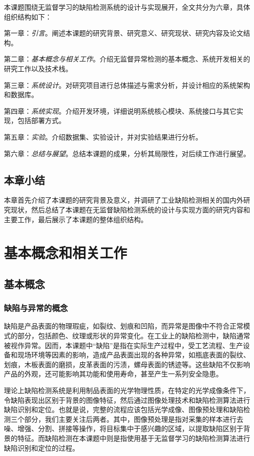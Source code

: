 \documentclass[
  ]{njuthesis}
\begin{document}
本课题围绕无监督学习的缺陷检测系统的设计与实现展开，全文共分为六章，具体组织结构如下：  

第一章：\textit{引言}。阐述本课题的研究背景、研究意义、研究现状、研究内容及论文结构。

第二章：\textit{基本概念与相关工作}。介绍无监督异常检测的基本概念、系统开发相关的研究工作以及技术栈。

第三章：\textit{系统设计}。对研究项目进行总体描述与需求分析，并设计相应的系统架构和数据库。

第四章：\textit{系统实现}。介绍开发环境，详细说明系统核心模块、系统接口与其它实现，包括部署方式。

第五章：\textit{实验}。介绍数据集、实验设计，并对实验结果进行分析。

第六章：\textit{总结与展望}。总结本课题的成果，分析其局限性，对后续工作进行展望。 

\section{本章小结}

本章首先介绍了本课题的研究背景及意义，并调研了工业缺陷检测相关的国内外研究现状，然后总结了本课题在无监督缺陷检测系统的设计与实现方面的研究内容和主要工作，最后展示了本课题的整体组织结构。

\chapter{基本概念和相关工作}

\section{基本概念}

\subsection{缺陷与异常的概念}

缺陷是产品表面的物理瑕疵，如裂纹、划痕和凹陷，而异常是图像中不符合正常模式的部分，包括颜色、纹理或形状的异常变化\cite{[6]}。在工业上的缺陷检测中，缺陷通常被视作异常。因而，本课题中“缺陷”是指在实际生产过程中，受工艺流程、生产设备和现场环境等因素的影响，造成产品表面出现的各种异常\cite{[4]}，如瓶底表面的裂纹、划痕，木板表面的磨损，皮革表面的污渍，螺母表面的锈迹等。这些缺陷不仅影响产品的外观，还可能影响其功能和使用寿命，甚至产生一系列安全隐患。

理论上缺陷检测系统是利用制品表面的光学物理性质，在特定的光学成像条件下，令缺陷表现出区别于背景的图像特征，然后通过图像处理技术和缺陷检测算法进行缺陷识别和定位\cite{[7]}。也就是说，完整的流程应该包括光学成像、图像预处理和缺陷检测三个部分，我们主要关注后两者。其中，图像预处理是指对采集的样本进行去噪、增强、分割、拼接等操作，将目标集中于感兴趣的区域，以提取缺陷区别于背景的特征。而缺陷检测在本课题中则是指使用基于无监督学习的缺陷检测算法进行缺陷识别和定位的过程。
\end{document}
